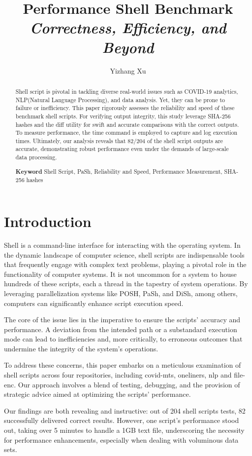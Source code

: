 \documentclass[sigplan, screen, 10pt]{acmart}
\title{Performance Shell Benchmark \newline
\emph{Correctness, Efficiency, and Beyond}}
\author{Yizhang Xu}
\affiliation{BUPT}
\begin{document}
\begin{abstract}
Shell script is pivotal in tackling diverse real-world issues such as COVID-19 analytics, NLP(Natural Language Processing), and data analysis. 
Yet, they can be prone to failure or inefficiency.
This paper rigorously assesses the reliability and speed of these benchmark shell scripts.
For verifying output integrity, this study leverage SHA-256 hashes and the diff utility for swift and accurate comparisons with the correct outputs.
To measure performance, the time command is employed to capture and log execution times.
Ultimately, our analysis reveals that 82/204 of the shell script outputs are accurate, demonstrating robust performance even under the demands of large-scale data processing.

\textbf{Keyword} Shell Script, PaSh, Reliability and Speed, Performance Measurement, SHA-256 hashes
\end{abstract}

\maketitle

\section{Introduction}
\label{intro}
Shell\cite{johnson2006shell} is a command-line interface for interacting with the operating system\cite{newham2005learning}.
In the dynamic landscape of computer science, shell scripts are indispensable tools that frequently engage with complex text problems, playing a pivotal role in the functionality of computer systems\cite{naik2018learning}.
It is not uncommon for a system to house hundreds of these scripts, each a thread in the tapestry of system operations\cite{leite2014deploying}\cite{goforth2013role}.
By leveraging parallelization systems like POSH\cite{raghavan2020posh}, PaSh\cite{vasilakis2021pash}, and DiSh\cite{mustafa2023dish}, among others, computers can significantly enhance script execution speed.\par
The core of the issue lies in the imperative to ensure the scripts' accuracy and performance. 
A deviation from the intended path or a substandard execution mode can lead to inefficiencies and, more critically, to erroneous outcomes that undermine the integrity of the system's operations\cite{goforth2013role}.\par
To address these concerns, this paper embarks on a meticulous examination of shell scripts across four repositories, including covid-mts, oneliners, nlp\cite{ofer2021language} and file-enc. 
Our approach involves a blend of testing, debugging, and the provision of strategic advice aimed at optimizing the scripts' performance.\par
Our findings are both revealing and instructive: out of 204 shell scripts tests, 82 successfully delivered correct results. 
However, one script's performance stood out, taking over 5 minutes to handle a 1GB text file, underscoring the necessity for performance enhancements, especially when dealing with voluminous data sets.
\end{document}
